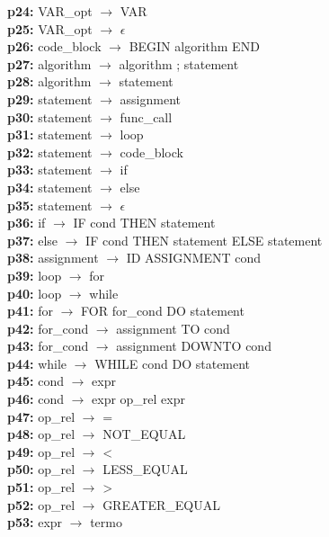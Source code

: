 \documentclass[12pt,a4paper]{report}
\begin{document}
\begin{tabbing}
\textbf{p24:} \> VAR\_opt \(\to\) VAR \\
\textbf{p25:} \> VAR\_opt \(\to\) \(\epsilon\) \\
\textbf{p26:} \> code\_block \(\to\) BEGIN algorithm END \\
\textbf{p27:} \> algorithm \(\to\) algorithm ; statement \\
\textbf{p28:} \> algorithm \(\to\) statement \\
\textbf{p29:} \> statement \(\to\) assignment \\
\textbf{p30:} \> statement \(\to\) func\_call \\
\textbf{p31:} \> statement \(\to\) loop \\
\textbf{p32:} \> statement \(\to\) code\_block \\
\textbf{p33:} \> statement \(\to\) if \\
\textbf{p34:} \> statement \(\to\) else \\
\textbf{p35:} \> statement \(\to\) \(\epsilon\) \\
\textbf{p36:} \> if \(\to\) IF cond THEN statement \\
\textbf{p37:} \> else \(\to\) IF cond THEN statement ELSE statement \\
\textbf{p38:} \> assignment \(\to\) ID ASSIGNMENT cond \\
\textbf{p39:} \> loop \(\to\) for \\
\textbf{p40:} \> loop \(\to\) while \\
\textbf{p41:} \> for \(\to\) FOR for\_cond DO statement \\
\textbf{p42:} \> for\_cond \(\to\) assignment TO cond \\
\textbf{p43:} \> for\_cond \(\to\) assignment DOWNTO cond \\
\textbf{p44:} \> while \(\to\) WHILE cond DO statement \\
\textbf{p45:} \> cond \(\to\) expr \\
\textbf{p46:} \> cond \(\to\) expr op\_rel expr \\
\textbf{p47:} \> op\_rel \(\to\) = \\
\textbf{p48:} \> op\_rel \(\to\) NOT\_EQUAL \\
\textbf{p49:} \> op\_rel \(\to\) < \\
\textbf{p50:} \> op\_rel \(\to\) LESS\_EQUAL \\
\textbf{p51:} \> op\_rel \(\to\) > \\
\textbf{p52:} \> op\_rel \(\to\) GREATER\_EQUAL \\
\textbf{p53:} \> expr \(\to\) termo \\

\end{tabbing}
\end{document}
